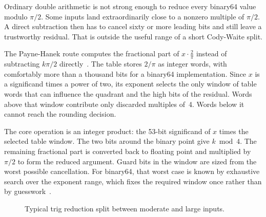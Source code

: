 \documentclass[manuscript, nonacm]{acmart}
\begin{document}
    Ordinary double arithmetic is not strong enough to reduce every binary64 value
    modulo $\pi/2$. Some inputs land extraordinarily close to a nonzero multiple
    of $\pi/2$. A direct subtraction then has to cancel sixty or more leading bits
    and still leave a trustworthy residual. That is outside the useful range of a
    short Cody-Waite split.

    The Payne-Hanek route computes the fractional part of
    $x \cdot \tfrac{2}{\pi}$ instead of subtracting $k\pi/2$ directly~\cite{payne1983}.
    The table stores $2/\pi$ as integer words, with comfortably more than a
    thousand bits for a binary64 implementation. Since $x$ is a significand times
    a power of two, its exponent selects the only window of table words that can
    influence the quadrant and the high bits of the residual. Words above that
    window contribute only discarded multiples of~4. Words below it cannot reach
    the rounding decision.

    The core operation is an integer product: the 53-bit significand of $x$ times
    the selected table window. The two bits around the binary point give
    $k \bmod 4$. The remaining fractional part is converted back to floating point
    and multiplied by $\pi/2$ to form the reduced argument. Guard bits in the
    window are sized from the worst possible cancellation. For binary64, that
    worst case is known by exhaustive search over the exponent range, which fixes
    the required window once rather than by guesswork~\cite{muller}.

    \begin{figure}[tbp]
        \centering
        \caption{Typical trig reduction split between moderate and large inputs.}
    \end{figure}
\end{document}

